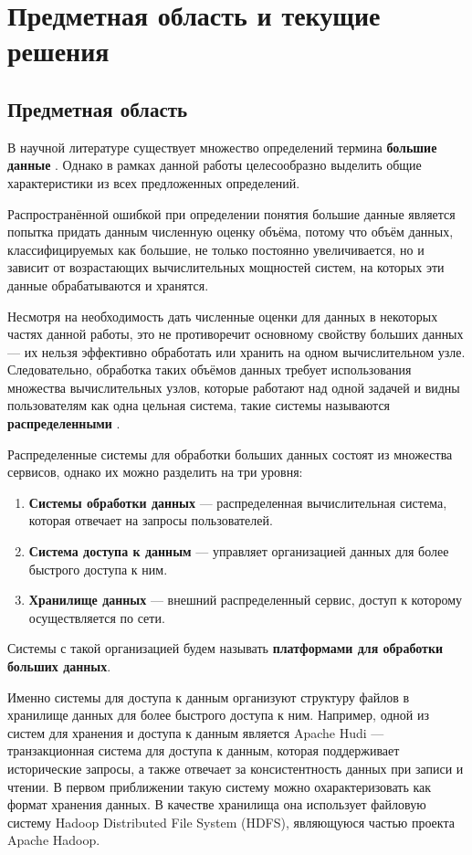 \section{Предметная область и текущие решения}
\subsection{Предметная область} \label{definition}

В научной литературе существует множество определений термина \textbf{большие данные} \cite{Bigdata_a_review, Bigdata_an_introduction, Challenges_of_big_data_analysis}. Однако в рамках данной работы целесообразно выделить общие характеристики из всех предложенных определений. 

Распространённой ошибкой при определении понятия большие данные является попытка придать данным численную оценку объёма, потому что объём данных, классифицируемых как большие, не только постоянно увеличивается, но и зависит от возрастающих вычислительных мощностей систем, на которых эти данные обрабатываются и хранятся. 

Несмотря на необходимость дать численные оценки для данных в некоторых частях данной работы, это не противоречит основному свойству больших данных --- их нельзя эффективно обработать или хранить на одном вычислительном узле. Следовательно, обработка таких объёмов данных требует использования множества вычислительных узлов, которые работают над одной задачей и видны пользователям как одна цельная система, такие системы называются \textbf{распределенными} \cite{Time_clocks_and_the_ordering_of_events_in_a_distributed_system}.

Распределенные системы для обработки больших данных состоят из множества сервисов, однако их можно разделить на три уровня: \cite{Spatial_big_data_architecture}
\begin{enumerate}
    \item \textbf{Системы обработки данных} --- распределенная вычислительная система, которая отвечает на запросы пользователей.
    \item \textbf{Система доступа к данным} --- управляет организацией данных для более быстрого доступа к ним.
    \item \textbf{Хранилище данных} --- внешний распределенный сервис, доступ к которому осуществляется по сети.
\end{enumerate}
Системы с такой организацией будем называть \textbf{платформами для обработки больших данных}.

Именно системы для доступа к данным организуют структуру файлов в хранилище данных для более быстрого доступа к ним. Например, одной из систем для хранения и доступа к данным является Apache Hudi --- транзакционная система для доступа к данным, которая поддерживает исторические запросы, а также отвечает за консистентность данных при записи и чтении. В первом приближении такую систему можно охарактеризовать как формат хранения данных. В качестве хранилища она использует файловую систему Hadoop Distributed File System (HDFS), являющуюся частью проекта Apache Hadoop. 

